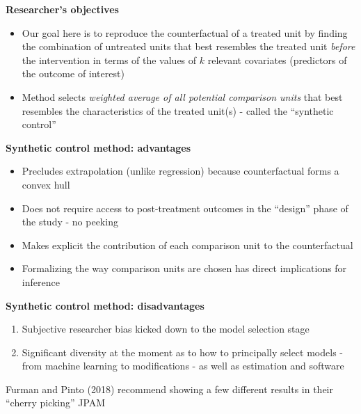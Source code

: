 \documentclass[notes=show]{beamer}
\begin{document}
\begin{frame}[plain]
\begin{center}
\textbf{Researcher's objectives}
\end{center}

\begin{itemize}
	\item Our goal here is to reproduce the counterfactual of a treated unit by finding the combination of untreated units that best resembles the treated unit \emph{before} the intervention in terms of the values of $k$ relevant covariates (predictors of the outcome of interest)
	\item Method selects \emph{weighted average of all potential comparison units} that best resembles the characteristics of the treated unit(s) - called the ``synthetic control''
\end{itemize}

\end{frame}

\begin{frame}[plain]
	\begin{center}
	\textbf{Synthetic control method: advantages}
	\end{center}
	
	\begin{itemize}
	\item Precludes extrapolation (unlike regression) because counterfactual forms a convex hull
	\item Does not require access to post-treatment outcomes in the ``design'' phase of the study - no peeking
	\item Makes explicit the contribution of each comparison unit to the counterfactual 
	\item Formalizing the way comparison units are chosen has direct implications for inference
	\end{itemize}
\end{frame}


\begin{frame}[plain]
\begin{center}
\textbf{Synthetic control method: disadvantages}
\end{center}

\begin{enumerate}
\item Subjective researcher bias kicked down to the model selection stage
\item Significant diversity at the moment as to how to principally select models - from machine learning to modifications - as well as estimation and software
\end{enumerate}


Furman and Pinto (2018) recommend showing a few different results in their ``cherry picking'' JPAM

\end{frame}
\end{document}
